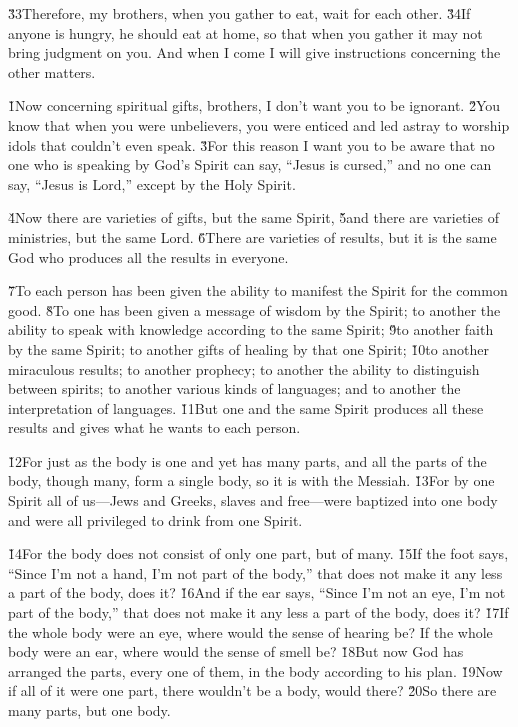 \v{33}Therefore, my brothers, when you gather to eat, wait for each other. \v{34}If anyone is hungry, he should eat at home, so that when you gather it may not bring judgment on you. And when I come I will give instructions concerning the other matters.

\v{1}Now concerning spiritual gifts, brothers, I don't want you to be ignorant. \v{2}You know that when you were unbelievers, you were enticed and led astray to worship idols that couldn't even speak. \v{3}For this reason I want you to be aware that no one who is speaking by God's Spirit can say, ``Jesus is cursed,'' and no one can say, ``Jesus is Lord,'' except by the Holy Spirit.

\v{4}Now there are varieties of gifts, but the same Spirit, \v{5}and there are varieties of ministries, but the same Lord. \v{6}There are varieties of results, but it is the same God who produces all the results in everyone.

\v{7}To each person has been given the ability to manifest the Spirit for the common good. \v{8}To one has been given a message of wisdom by the Spirit; to another the ability to speak with knowledge according to the same Spirit; \v{9}to another faith by the same Spirit; to another gifts of healing by that one Spirit; \v{10}to another miraculous results; to another prophecy; to another the ability to distinguish between spirits; to another various kinds of languages; and to another the interpretation of languages. \v{11}But one and the same Spirit produces all these results and gives what he wants to each person.

\v{12}For just as the body is one and yet has many parts, and all the parts of the body, though many, form a single body, so it is with the Messiah. \v{13}For by one Spirit all of us---Jews and Greeks, slaves and free---were baptized into one body and were all privileged to drink from one Spirit.

\v{14}For the body does not consist of only one part, but of many. \v{15}If the foot says, ``Since I'm not a hand, I'm not part of the body,'' that does not make it any less a part of the body, does it? \v{16}And if the ear says, ``Since I'm not an eye, I'm not part of the body,'' that does not make it any less a part of the body, does it? \v{17}If the whole body were an eye, where would the sense of hearing be? If the whole body were an ear, where would the sense of smell be? \v{18}But now God has arranged the parts, every one of them, in the body according to his plan. \v{19}Now if all of it were one part, there wouldn't be a body, would there? \v{20}So there are many parts, but one body.

